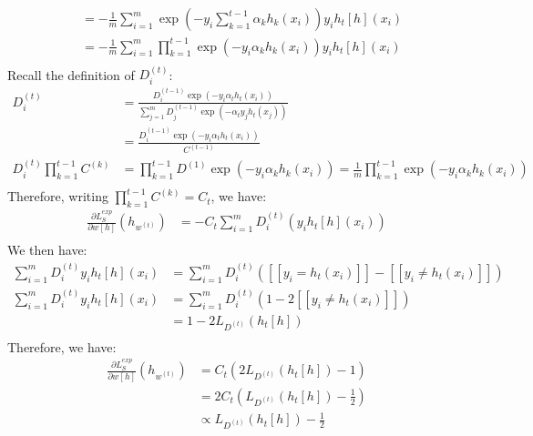 \documentclass{amsart}
\theoremstyle{definition}
\begin{document}
\begin{enumerate}[(a)]
\begin{align*}
      &= -\frac{1}{m} \sum_{i=1}^{m} \exp\left(-y_i \sum_{k = 1}^{t-1} \alpha_k h_k(x_i)\right) y_i h_t[h](x_i)\\
      &= -\frac{1}{m} \sum_{i = 1}^{m} \prod_{k = 1}^{t-1}\exp(-y_i \alpha_k h_k(x_i)) y_i h_t[h](x_i)\\
    \end{align*}
    Recall the definition of $D_i^{(t)}$:
    \begin{align*}
      D_i^{(t)} &= \frac{D_{i}^{(t-1)}\exp(-y_i \alpha_t h_t(x_i))}{\sum_{j = 1}^{m}D_j^{(t-1)}\exp(-\alpha_ty_jh_t(x_j))}\\
      &= \frac{D_i^{(t-1)}\exp(-y_i\alpha_t h_t(x_i))}{C^{(t-1)}}\\
      D_i^{(t)} \prod_{k = 1}^{t-1} C^{(k)}&= \prod_{k=1}^{t-1}D^{(1)}\exp(-y_i\alpha_k h_k(x_i)) = \frac{1}{m}\prod_{k=1}^{t-1}\exp(-y_i\alpha_k h_k(x_i))\\
    \end{align*}
    Therefore, writing $\prod_{k=1}^{t-1} C^{(k)} = C_t$, we have:
    \begin{align*}
      \frac{\partial L_S^{exp}}{\partial w[h]}(h_{w^{(t)}}) &= -C_t \sum_{i=1}^{m} D_i^{(t)} (y_i h_t[h](x_i))\\
    \end{align*}
    We then have:
    \begin{align*}
      \sum_{i = 1}^{m} D_i^{(t)} y_i h_t[h](x_i) &= \sum_{i = 1}^{m} D_i^{(t)} ([[y_i = h_t(x_i)]] - [[y_i \neq h_t(x_i)]])\\
      \sum_{i = 1}^{m} D_i^{(t)} y_i h_t[h](x_i) &= \sum_{i = 1}^{m} D_i^{(t)} (1 - 2[[y_i \neq h_t(x_i)]])\\
      &= 1 - 2 L_{D^{(t)}}(h_t[h])\\
    \end{align*}
    Therefore, we have:
    \begin{align*}
      \frac{\partial L_S^{exp}}{\partial w[h]}(h_{w^{(t)}}) &= C_t (2 L_{D^{(t)}}(h_t[h]) - 1)\\
      &= 2C_t(L_{D^{(t)}}(h_t[h]) - \frac{1}{2})\\
      &\propto L_{D^{(t)}}(h_t[h]) - \frac{1}{2}
    \end{align*}
  \end{enumerate}
\end{document}
